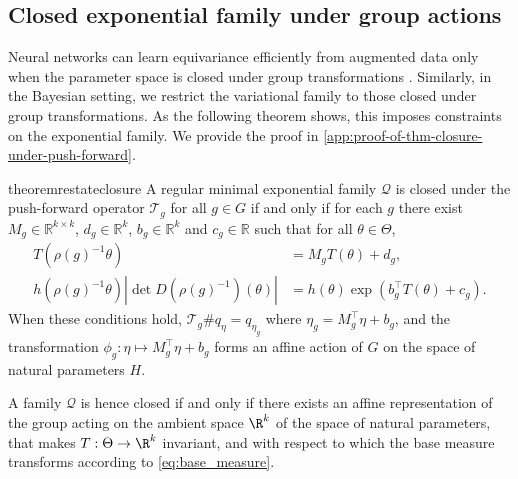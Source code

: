 \documentclass{article}
\begin{document}
\subsection{Closed exponential family under group actions}
\label{sec:closed-exponential-family-under-group-actions}

Neural networks can learn equivariance efficiently from augmented data only when the parameter space is closed under group transformations \citep{nordenfors2025optimization}. Similarly, in the Bayesian setting, we restrict the variational family to those closed under group transformations. As the following theorem shows, this imposes constraints on the exponential family.
We provide the proof in \cref{app:proof-of-thm-closure-under-push-forward}.

\begin{restatable}{theorem}{restateclosure}
\label{thm:closure-under-push-forward}
A regular minimal exponential family $\mathcal{Q}$ is closed under the push-forward operator $\mathcal{T}_{g}$ for all $g \in G$ if and only if for each $g$ there exist $M_{g} \in \mathbb{R}^{k \times k}$, $d_{g} \in \mathbb{R}^{k}$, $b_{g} \in \mathbb{R}^{k}$ and $c_{g} \in \mathbb{R}$ such that for all $\theta \in \Theta$,
\begin{align}
    T(\rho(g)^{-1} \theta) &= M_{g} T(\theta) + d_{g}, \\
    h(\rho(g)^{-1} \theta) \left|\det D(\rho(g)^{-1})(\theta)\right| &= h(\theta) \exp(b_{g}^\top T(\theta) + c_{g}). \label{eq:base_measure}
\end{align}
When these conditions hold, $\mathcal{T}_{g} \# q_{\eta} = q_{\eta_{g}}$ where $\eta_{g} = M_{g}^\top\eta + b_{g}$, and the transformation  $\phi_{g}: \eta\mapsto M_{g}^\top\eta + b_{g}$ forms an affine action of $G$ on the space of natural parameters $H$.
\end{restatable}
A family $\mathcal{Q}$ is hence closed if and only if there exists an affine representation of the group acting on the ambient space $\R^k$ of the space of natural parameters, that makes $T: \Theta \to \R^k$ invariant, and with respect to which the base measure transforms according to \eqref{eq:base_measure}.
\end{document}

